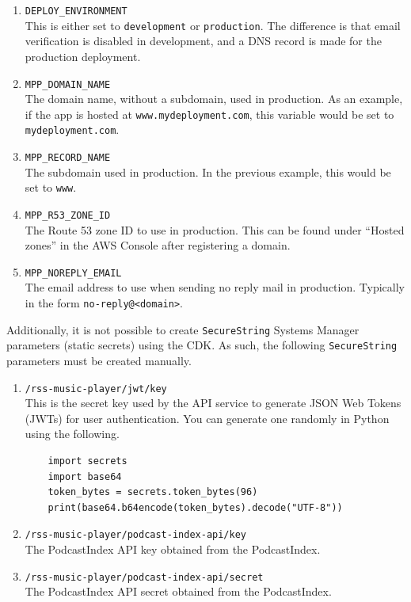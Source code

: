 \documentclass{article}
\begin{document}
\begin{enumerate}
    \item \verb|DEPLOY_ENVIRONMENT| \\
    This is either set to \verb|development| or \verb|production|. The difference is that
    email verification is disabled in development, and a DNS record is made for the 
    production deployment.
    \item \verb|MPP_DOMAIN_NAME| \\
    The domain name, without a subdomain, used in production. As an example,
    if the app is hosted at \verb|www.mydeployment.com|, this variable would be set to
    \verb|mydeployment.com|.
    \item \verb|MPP_RECORD_NAME| \\
    The subdomain used in production. In the previous example, this would be set to
    \verb|www|.
    \item \verb|MPP_R53_ZONE_ID| \\
    The Route 53 zone ID to use in production. This can be found under ``Hosted zones''
    in the AWS Console after registering a domain.
    \item \verb|MPP_NOREPLY_EMAIL| \\
    The email address to use when sending no reply mail in production. Typically in the
    form \verb|no-reply@<domain>|.
\end{enumerate}

Additionally, it is not possible to create \verb|SecureString| Systems Manager
parameters (static secrets) using the CDK. As such, the following \verb|SecureString|
parameters must be created manually.

\begin{enumerate}
    \item \verb|/rss-music-player/jwt/key| \\
    This is the secret key used by the API service to generate JSON Web Tokens (JWTs) for
    user authentication. You can generate one randomly in Python using the following.
    \pagebreak
    \begin{verbatim}
    import secrets
    import base64
    token_bytes = secrets.token_bytes(96)
    print(base64.b64encode(token_bytes).decode("UTF-8"))
    \end{verbatim}
    \item \verb|/rss-music-player/podcast-index-api/key| \\
    The PodcastIndex API key obtained from the PodcastIndex.
    \item \verb|/rss-music-player/podcast-index-api/secret| \\
    The PodcastIndex API secret obtained from the PodcastIndex.
\end{enumerate}
\end{document}
